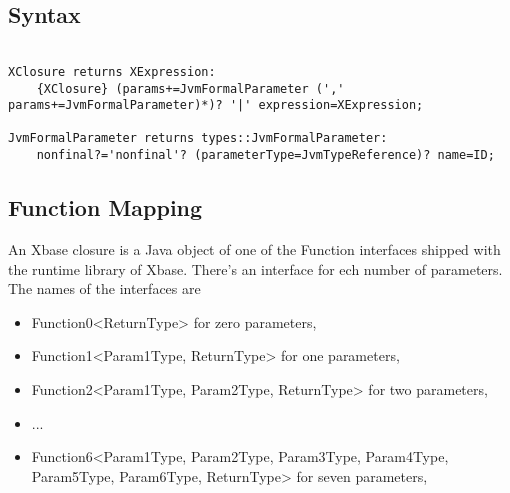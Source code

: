 \documentclass[a4paper,10pt]{scrreprt}
\newlength{\itemindentlen}
\begin{document}
\subsection{ Syntax }


\begin{lstlisting}

XClosure returns XExpression:
	{XClosure} (params+=JvmFormalParameter (',' params+=JvmFormalParameter)*)? '|' expression=XExpression;
	
JvmFormalParameter returns types::JvmFormalParameter:
	nonfinal?='nonfinal'? (parameterType=JvmTypeReference)? name=ID;

\end{lstlisting}





\subsection{ Function Mapping }
\label{FunctionMapping}

An Xbase closure is a Java object of one of the Function interfaces shipped with the runtime library of Xbase. There's an interface for ech number of parameters.
The names of the interfaces are 

\setlength{\itemindentlen}{\textwidth}
\begin{itemize}
\addtolength{\itemindentlen}{-2em}

\item \begin{minipage}[t]{\itemindentlen}
Function0<ReturnType> for zero parameters, 
\end{minipage}

\item \begin{minipage}[t]{\itemindentlen}
Function1<Param1Type, ReturnType> for one parameters, 
\end{minipage}

\item \begin{minipage}[t]{\itemindentlen}
Function2<Param1Type, Param2Type, ReturnType> for two parameters, 
\end{minipage}

\item \begin{minipage}[t]{\itemindentlen}
... 
\end{minipage}

\item \begin{minipage}[t]{\itemindentlen}
Function6<Param1Type, Param2Type, Param3Type, Param4Type, Param5Type, Param6Type, ReturnType> for seven parameters, 
\end{minipage}

\end{itemize}
\addtolength{\itemindentlen}{2em}
\end{document}
